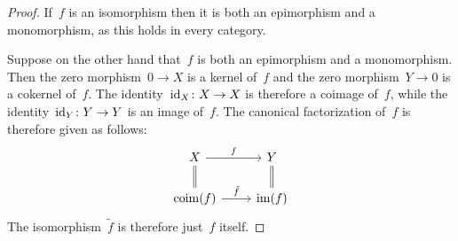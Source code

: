 \begin{proof}
  If~$f$ is an isomorphism then it is both an epimorphism and a monomorphism, as this holds in every category.
  
  Suppose on the other hand that~$f$ is both an epimorphism and a monomorphism.
  Then the zero morphism~$0 \to X$ is a kernel of~$f$ and the zero morphism~$Y \to 0$ is a cokernel of~$f$.
  The identity~$\operatorname{id}_X \colon X \to X$ is therefore a coimage of~$f$, while the identity~$\operatorname{id}_Y \colon Y \to Y$ is an image of~$f$.
  The canonical factorization of~$f$ is therefore given as follows:
  \[
    \begin{tikzcd}
        X
        \arrow{r}[above]{f}
        \arrow[equal]{d}
      & Y
        \arrow[equal]{d}
      \\
        \coim(f)
        \arrow{r}[above]{\tilde{f}}
      & \im(f)
    \end{tikzcd}
  \]
  The isomorphism~$\tilde{f}$ is therefore just~$f$ itself.
\end{proof}




